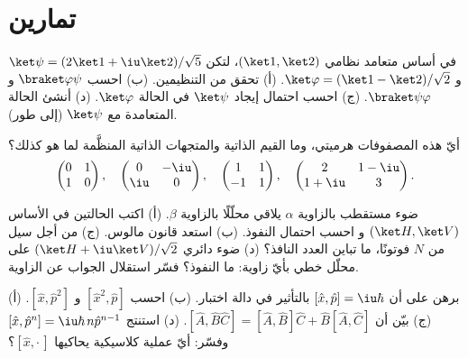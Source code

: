 \section{تمارين}

\begin{exercise}[$\star$]\label{exo:b3:quantum-formalism:1}
في أساس متعامد نظامي $(\ket1, \ket2)$، لتكن $\ket\psi = (2\ket1 +
\iu\ket2)/\sqrt5$ و $\ket\varphi = (\ket1 - \ket2)/\sqrt2$. (أ)
تحقق من التنظيمين. (ب) احسب $\braket\varphi\psi$ و
$\braket\psi\varphi$. (ج) احسب احتمال إيجاد $\ket\psi$ في
الحالة $\ket\varphi$. (د) أنشئ الحالة المتعامدة مع
$\ket\psi$ (إلى طور).
\end{exercise}

\begin{exercise}[$\star$]\label{exo:b3:quantum-formalism:2}
أيّ هذه المصفوفات هرميتي، وما القيم الذاتية
والمتجهات الذاتية المنظَّمة لما هو كذلك؟
\[
\begin{pmatrix}0 & 1\\ 1 & 0\end{pmatrix} , \quad
\begin{pmatrix}0 & -\iu\\ \iu & 0\end{pmatrix} , \quad
\begin{pmatrix}1 & 1\\ -1 & 1\end{pmatrix} , \quad
\begin{pmatrix}2 & 1-\iu\\ 1+\iu & 3\end{pmatrix} .
\]
\end{exercise}

\begin{exercise}[$\star$]\label{exo:b3:quantum-formalism:3}
ضوء مستقطب بالزاوية $\alpha$ يلاقي محلّلًا بالزاوية
$\beta$. (أ) اكتب الحالتين في الأساس $(\ket H, \ket V)$ و
احسب احتمال النفوذ. (ب) استعد قانون مالوس. (ج)
من أجل سيل من $N$ فوتونًا، ما تباين العدد
النافذ؟ (د) ضوء دائري $(\ket H + \iu\ket V)/\sqrt2$ على محلّل
خطي بأيّ زاوية: ما النفوذ؟ فسّر استقلال الجواب
عن الزاوية.
\end{exercise}

\begin{exercise}[$\star$]\label{exo:b3:quantum-formalism:4}
(أ) برهن على أن $[\hat x, \hat p] = \iu\hbar$ بالتأثير في دالة اختبار.
(ب) احسب $[\hat x^2, \hat p]$ و $[\hat x, \hat p^2]$. (ج) بيّن أن
$[\hat A, \hat B\hat C] = [\hat A, \hat B]\hat C + \hat B[\hat A,
\hat C]$. (د) استنتج $[\hat x, \hat p^n] = \iu\hbar\,n\hat p^{n-1}$
وفسّر: أيّ عملية كلاسيكية يحاكيها $[\hat x, \cdot\,]$؟
\end{exercise}

